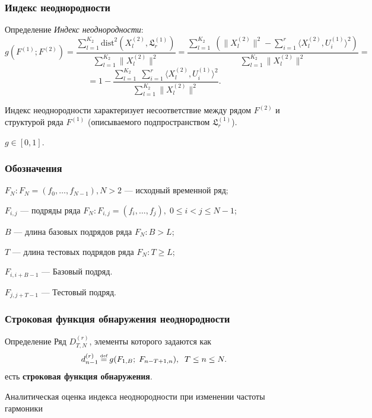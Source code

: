\documentclass[11pt]{beamer}
\newcommand\eqdef{\mathrel{\stackrel{\makebox[0pt]{\mbox{\normalfont\tiny def}}}{=}}}
\begin{document}
	\begin{frame}
		\frametitle{Индекс неоднородности}	
		\begin{block}{Определение}  \textit{Индекс неоднородности}:
			$$ g(F^{(1)}; F^{(2)}) = \frac{\sum\limits_{l=1}^{K_2}\mathrm{dist}^2(X_l^{(2)}, \mathfrak{L}_r^{(1)})}{\sum\limits_{l=1}^{K_2}\|X_l^{(2)}\|^2} = \frac{\sum\limits_{l=1}^{K_2}\;(\|X_l^{(2)}\|^2 - \sum\limits_{i=1}^{r}\langle X_l^{(2)}, U_i^{(1)}\rangle^2)}{\sum\limits_{l=1}^{K_2}\|X_l^{(2)}\|^2} = $$
			$$ = 1 - \frac{\sum\limits_{l=1}^{K_2}\;\sum\limits_{i=1}^{r}\langle X_l^{(2)}, U_i^{(1)}\rangle^2}{\sum\limits_{l=1}^{K_2}\|X_l^{(2)}\|^2}. $$
		\end{block}
		Индекс неоднородности характеризует несоответствие между рядом $F^{(2)}$ и структурой ряда $F^{(1)}$ (описываемого подпространством $ \mathfrak{L}_r^{(1)} $).
		
		$g \in [0, 1]$.
		
	\end{frame}
	\begin{frame}
		\frametitle{Обозначения}
		\begin{block}{}
			$ F_N: F_N = (f_0, \dotsc, f_{N - 1}), N > 2 $ --- исходный временной ряд;
			
			$ F_{i, j} $ --- подряды ряда $ F_N: F_{i, j} = (f_{i}, \dotsc, f_{j}), \; 0 \leq i < j \leq N - 1 $;
			
			$ B $ --- длина базовых подрядов ряда $ F_N: B > L $;
						
			$ T $ --- длина тестовых подрядов ряда $ F_N: T \geq L $;
			
			
			$ F_{i, i+B-1} $ --- Базовый подряд.
			
			$ F_{j, j+T-1} $ --- Тестовый подряд.

		\end{block}
	\end{frame}

	\begin{frame}
		\frametitle{Строковая функция обнаружения неоднородности}
		\begin{block}{Определение}
			Ряд $ D_{T,N}^{(r)} $, элементы которого задаются как 
			$$ d_{n-1}^{(r)} \eqdef g(F_{1, B};\; F_{n-T+1, n}), \;\; T \leq n \leq N. $$
			есть \textbf{строковая функция обнаружения}.
		\end{block}
	\end{frame}
	
	\begin{frame}
		\centering
		Аналитическая оценка индекса неоднородности при изменении частоты гармоники
	\end{frame}
	
\end{document}
